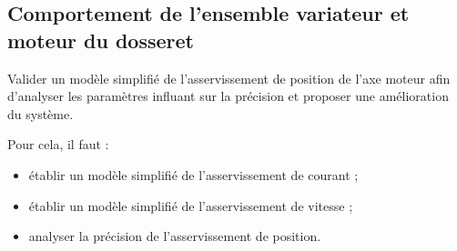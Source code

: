 \documentclass[10pt,fleqn]{article} %
\begin{document}
\begin{multicols}{2}



%
%
%
%

\subsection{Comportement de l'ensemble variateur et moteur du dosseret}

\begin{obj}
Valider un modèle simplifié de l'asservissement de position de l'axe
moteur afin d'analyser les paramètres influant sur la précision et
proposer une amélioration du système.

Pour cela, il faut :
\begin{itemize}
\item établir un modèle simplifié de l'asservissement de courant ;
\item établir un modèle simplifié de l'asservissement de vitesse ;
\item analyser la précision de l'asservissement de position.
\end{itemize}
\end{obj}



\end{multicols}
\end{document}
